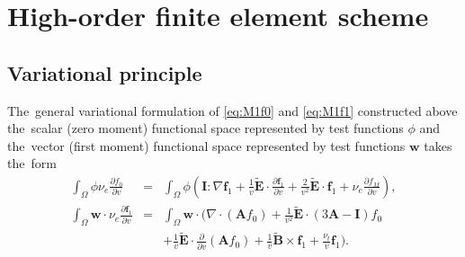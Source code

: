 \documentclass[review]{elsarticle}
\newcommand{\pdv}[2]{\frac{\partial{#1}}{\partial{#2}}}
\newcommand{\vect}[1]{\boldsymbol{#1}}
\newcommand{\matr}[1]{\mathbf{#1}}
\newcommand{\nue}{\nu_{e}}
\newcommand{\nutot}{\nu_{t}}
\newcommand{\vmag}{v}
\newcommand{\E}{\vect{E}}
\newcommand{\B}{\vect{B}}
\newcommand{\tE}{\vect{\tilde{E}}}
\newcommand{\tB}{\vect{\tilde{B}}}
\newcommand{\qe}{q_e}
\newcommand{\me}{m_e}
\newcommand{\fM}{f_M}
\newcommand{\fzero}{f_0}
\newcommand{\fone}{\vect{f}_1}
\newcommand{\MI}{\matr{I}}
\newcommand{\MA}{\matr{A}}
\newcommand{\intO}{\int_{\Omega}}
\begin{document}
\section{High-order finite element scheme}\label{sec:hos}

\subsection{Variational principle}
The~general variational formulation of \eqref{eq:M1f0} and \eqref{eq:M1f1} 
constructed above the~scalar (zero moment) functional space
represented by test functions $\phi$ and the~vector
(first moment) functional space represented by test functions $\vect{w}$ 
takes the~form
\begin{eqnarray}
  \intO\phi\nue\pdv{\fzero}{\vmag} &=& 
  \intO\phi
  \left(\MI:\nabla\fone + 
  \frac{1}{\vmag}\tE\cdot\pdv{\fone}{\vmag}
  + \frac{2}{\vmag^2}\tE\cdot\fone + \nue \pdv{\fM}{\vmag}\right) , 
  \label{eq:M1hosf0_variational}\\
  \intO\vect{w}\cdot\nue\pdv{\fone}{\vmag} &=&
  \intO\vect{w}\cdot\Bigg(\nabla\cdot\left(\MA\fzero\right)  
  + \frac{1}{\vmag^2}\tE\cdot\left( 3\MA - \MI \right)\fzero
  \nonumber\\
  && 
  + \frac{1}{\vmag}\tE\cdot\pdv{}{\vmag}
  \left( \MA\fzero\right) + \frac{1}{\vmag}\tB\times\fone + 
  \frac{\nutot}{\vmag}\fone\Bigg) .
  \label{eq:M1hosf1_variational}
\end{eqnarray}
\end{document}
